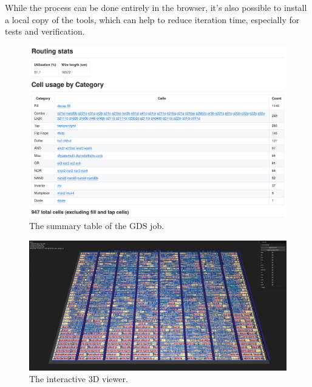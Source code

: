 While the process can be done entirely in the browser, it’s also possible to install a local copy of the tools\cite{localinstall}, which can help to reduce iteration time, especially for tests and verification.

\begin{figure}[htp]
\centering
\includegraphics[width=\columnwidth]{./Figs/gh action cell stats.png}
\caption{The summary table of the GDS job.}
\label{fig:summary_table_GDS_job}
\end{figure}

\begin{figure}[htp]
\centering
\includegraphics[width=\columnwidth]{./Figs/gh action gds 3d view.png}
\caption{The interactive 3D viewer.}
\label{fig:interactive_3D_viewer}
\end{figure}
